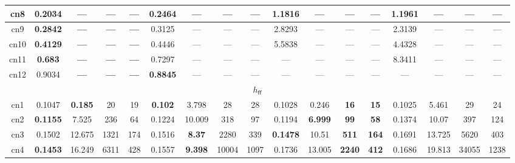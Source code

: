\begin{tabular}{||c||c|c|c|c||c|c|c|c||c|c|c|c||c|c|c|c||}
\hline%
cn8&\small{\textbf{0.2034}}&\small{\textbf{---}}&\small{\textbf{---}}&\small{\textbf{---}}&\small{0.2464}&\small{---}&\small{---}&\small{---}&\small{1.1816}&\small{---}&\small{---}&\small{---}&\small{1.1961}&\small{---}&\small{---}&\small{---}\\%
\hline%
cn9&\small{\textbf{0.2842}}&\small{\textbf{---}}&\small{\textbf{---}}&\small{\textbf{---}}&\small{0.3125}&\small{---}&\small{---}&\small{---}&\small{2.8293}&\small{---}&\small{---}&\small{---}&\small{2.3139}&\small{---}&\small{---}&\small{---}\\%
\hline%
cn10&\small{\textbf{0.4129}}&\small{\textbf{---}}&\small{\textbf{---}}&\small{\textbf{---}}&\small{0.4446}&\small{---}&\small{---}&\small{---}&\small{5.5838}&\small{---}&\small{---}&\small{---}&\small{4.4328}&\small{---}&\small{---}&\small{---}\\%
\hline%
cn11&\small{\textbf{0.683}}&\small{\textbf{---}}&\small{\textbf{---}}&\small{\textbf{---}}&\small{0.7297}&\small{---}&\small{---}&\small{---}&\small{---}&\small{---}&\small{---}&\small{---}&\small{8.3411}&\small{---}&\small{---}&\small{---}\\%
\hline%
cn12&\small{0.9034}&\small{\textbf{---}}&\small{\textbf{---}}&\small{\textbf{---}}&\small{\textbf{0.8845}}&\small{---}&\small{---}&\small{---}&\small{---}&\small{---}&\small{---}&\small{---}&\small{---}&\small{---}&\small{---}&\small{---}\\%
\hline%
\multicolumn{17}{||c||}{$h_{\mathsf{ff}}$}\\%
\hline%
cn1&\small{0.1047}&\small{\textbf{0.185}}&\small{20}&\small{19}&\small{\textbf{0.102}}&\small{3.798}&\small{28}&\small{28}&\small{0.1028}&\small{0.246}&\small{\textbf{16}}&\small{\textbf{15}}&\small{0.1025}&\small{5.461}&\small{29}&\small{24}\\%
\hline%
cn2&\small{\textbf{0.1155}}&\small{7.525}&\small{236}&\small{64}&\small{0.1224}&\small{10.009}&\small{318}&\small{97}&\small{0.1194}&\small{\textbf{6.999}}&\small{\textbf{99}}&\small{\textbf{58}}&\small{0.1374}&\small{10.07}&\small{397}&\small{124}\\%
\hline%
cn3&\small{0.1502}&\small{12.675}&\small{1321}&\small{174}&\small{0.1516}&\small{\textbf{8.37}}&\small{2280}&\small{339}&\small{\textbf{0.1478}}&\small{10.51}&\small{\textbf{511}}&\small{\textbf{164}}&\small{0.1691}&\small{13.725}&\small{5620}&\small{403}\\%
\hline%
cn4&\small{\textbf{0.1453}}&\small{16.249}&\small{6311}&\small{428}&\small{0.1557}&\small{\textbf{9.398}}&\small{10004}&\small{1097}&\small{0.1736}&\small{13.005}&\small{\textbf{2240}}&\small{\textbf{412}}&\small{0.1686}&\small{19.813}&\small{34055}&\small{1238}\\%

\end{tabular}
